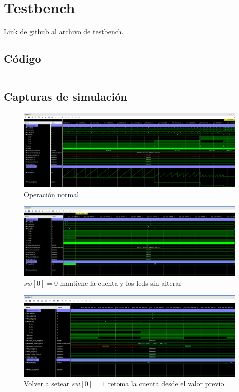 \section{Testbench}

\href{https://github.com/msebgarcia/DDA2024/blob/main/Lab01/tb/tb_shiftleds.sv}{Link de github} al archivo de testbench.

\subsection{Código}
\inputminted[fontsize=\footnotesize]{systemverilog}{../tb/tb_shiftleds.sv}

\newpage
\subsection{Capturas de simulación}

\begin{figure}[H]
    \centering
    \includegraphics[width=\textwidth]{captures/sim_normal_operation.png}
    \caption{Operación normal}
\end{figure}

\begin{figure}[H]
    \centering
    \includegraphics[width=\textwidth]{captures/sim_count_disabled.png}
    \caption{$sw[0] = 0$ mantiene la cuenta y los leds sin alterar}
\end{figure}

\begin{figure}[H]
    \centering
    \includegraphics[width=\textwidth]{captures/sim_count_re-enable.png}
    \caption{Volver a setear $sw[0] = 1$ retoma la cuenta desde el valor previo}
\end{figure}

